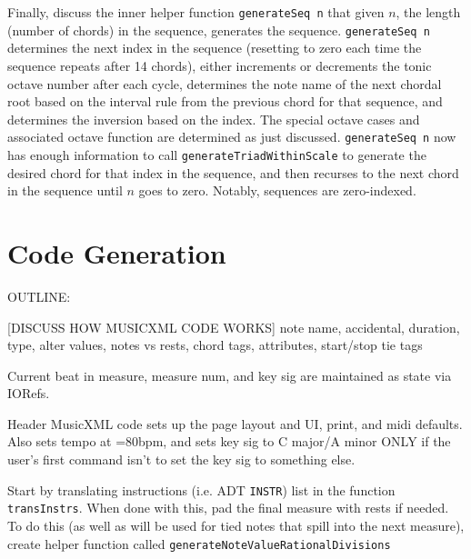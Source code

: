 \documentclass{report}
\begin{document}
Finally, discuss the inner helper function \verb.generateSeq n. that  given $n$, the length (number of chords) in the sequence, generates the sequence.  \verb.generateSeq n. determines the next index  in the sequence (resetting to zero each  time the sequence repeats after 14 chords), either  increments or decrements the tonic octave number after each cycle, determines the note name of the next chordal root based on the interval rule from the previous chord for that sequence, and determines the inversion based on the index. The special octave cases and associated octave function are determined as just discussed. \verb.generateSeq n. now has enough information to call  \verb.generateTriadWithinScale. to generate the desired chord for that index in the sequence, and then recurses to the next chord in the sequence until $n$ goes to zero. Notably, sequences are zero-indexed.
\chapter{Code Generation}
\label{chap:codegen}

OUTLINE:

[DISCUSS HOW MUSICXML CODE WORKS]
note name, accidental, duration, type, alter values, notes vs rests, chord tags, attributes, start/stop tie tags

Current beat in measure, measure num, and key sig are maintained as state via IORefs.

Header MusicXML code sets up the page layout and UI, print, and midi defaults. Also sets tempo at \musQuarter=80bpm, and sets key sig to C major/A minor ONLY if the user's first command isn't to set the key sig to something else.

Start by translating instructions (i.e. ADT \verb.INSTR.) list in the function \verb.transInstrs.. When done with this, pad the final measure with rests if needed. To do this (as well as will be used for tied notes that spill into the next measure), create helper function called \verb.generateNoteValueRationalDivisions. 
\end{document}
